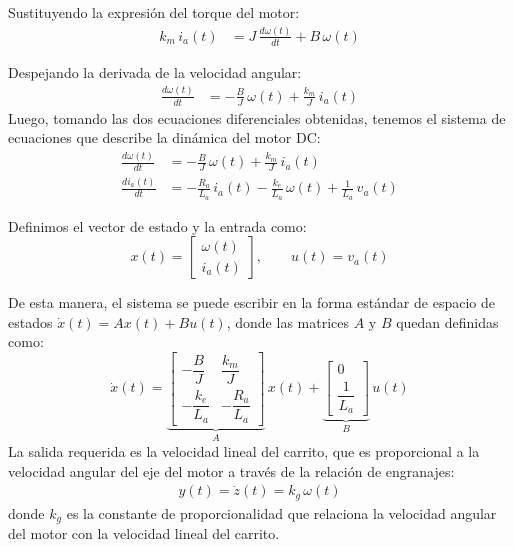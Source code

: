 \documentclass[
  11pt,
  letterpaper,
   addpoints,
   answers
  ]{exam}
\begin{document}
\begin{solution}
Sustituyendo la expresión del torque del motor:
\begin{align}
k_m\,i_a(t) &= J\,\frac{d\omega(t)}{dt} + B\,\omega(t)
\end{align}

Despejando la derivada de la velocidad angular:
\begin{align}
\frac{d\omega(t)}{dt} &= -\frac{B}{J}\,\omega(t) + \frac{k_m}{J}\,i_a(t)
\end{align}
Luego, tomando las dos ecuaciones diferenciales obtenidas, tenemos el sistema de ecuaciones que describe la dinámica del motor DC:
\begin{align}
 \frac{d\omega(t)}{dt} &= -\frac{B}{J}\,\omega(t) + \frac{k_m}{J}\,i_a(t) \\
  \frac{di_a(t)}{dt} &= -\frac{R_a}{L_a}\,i_a(t) - \frac{k_e}{L_a}\,\omega(t) + \frac{1}{L_a}\,v_a(t)
\end{align}

Definimos el vector de estado y la entrada como:
\begin{equation}
  x(t) = \begin{bmatrix}\omega(t)\\ i_a(t)\end{bmatrix}, \qquad
  u(t) = v_a(t)
\end{equation}

De esta manera, el sistema se puede escribir en la forma estándar de espacio de estados $\dot{x}(t) = Ax(t) + Bu(t)$, donde las matrices $A$ y $B$ quedan definidas como:
\begin{equation}
  \dot{x}(t) = 
  \underbrace{\begin{bmatrix}
    -\dfrac{B}{J} & \dfrac{k_m}{J}\\[6pt]
    -\dfrac{k_e}{L_a} & -\dfrac{R_a}{L_a}
  \end{bmatrix}}_{A}\,x(t)
  +
  \underbrace{\begin{bmatrix}
    0\\[2pt]\dfrac{1}{L_a}
  \end{bmatrix}}_{B}\,u(t)
\end{equation}
La salida requerida es la velocidad lineal del carrito, que es proporcional a la velocidad angular del eje del motor a través de la relación de engranajes:
\begin{align}
  y(t) = \dot{z}(t) = k_g\,\omega(t)
\end{align}
donde $k_g$ es la constante de proporcionalidad que relaciona la velocidad angular del motor con la velocidad lineal del carrito.


\end{solution}
\end{document}
